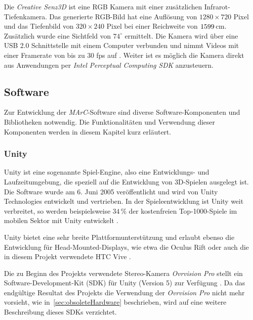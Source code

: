 Die \textit{Creative Senz3D} ist eine RGB Kamera mit einer zusätzlichen Infrarot-Tiefenkamera. Das generierte RGB-Bild hat eine Auflösung von $1280\times720$ Pixel und das Tiefenbild von $320\times240$ Pixel bei einer Reichweite von $15\-99\,$cm. Zusätzlich wurde eine Sichtfeld von $74^\circ$ ermittelt. Die Kamera wird über eine USB 2.0 Schnittstelle mit einem Computer verbunden und nimmt Videos mit einer Framerate von bis zu $30$ fps auf \cite{website:Senz3d}. Weiter ist es möglich die Kamera direkt aus Anwendungen per \textit{Intel Perceptual Computing SDK} anzusteuern.

\subsection{Software} 

Zur Entwicklung der \textit{MArC}-Software sind diverse Software-Komponenten und Bibliotheken notwendig. Die Funktionalitäten und Verwendung dieser Komponenten werden in diesem Kapitel kurz erläutert.


\subsubsection{Unity}\label{sec:unity}

Unity ist eine sogenannte Spiel-Engine, also eine Entwicklungs- und Laufzeitumgebung, die speziell auf die Entwicklung von 3D-Spielen ausgelegt ist. Die Software wurde am 6. Juni 2005 veröffentlicht \cite{haas2014history} und wird von Unity Technologies \cite{website:Unity} entwickelt und vertrieben. In der Spieleentwicklung ist Unity weit verbreitet, so werden beispielsweise $34\,\%$ der kostenfreien Top-1000-Spiele im mobilen Sektor mit Unity entwickelt \cite{website:UnityPR}.

Unity bietet eine sehr breite Plattformunterstützung \cite{website:UnityMultiPlatform} und erlaubt ebenso die Entwicklung für Head-Mounted-Displays, wie etwa die Oculus Rift \cite{website:UnityOculus}\cite{website:UnityVRoverview} oder auch die in diesem Projekt verwendete HTC Vive \cite{website:UnityVRoverview}.

Die zu Beginn des Projekts verwendete Stereo-Kamera \emph{Ovrvision Pro} stellt ein Software-Development-Kit (SDK) für Unity (Version 5) zur Verfügung \cite{website:ovrvisionSetup}. Da das endgültige Resultat des Projekts die Verwendung der \emph{Ovrvision Pro} nicht mehr vorsieht, wie in~\ref{sec:obsoleteHardware} beschrieben, wird auf eine weitere Beschreibung dieses SDKs verzichtet.

